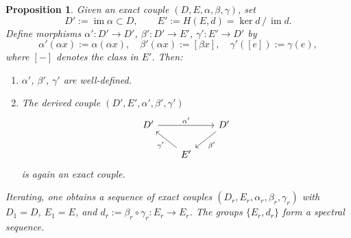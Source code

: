 \documentclass[12pt,a4paper]{article}
\newtheorem{proposition}[theorem]{Proposition}
\theoremstyle{definition}
\begin{document}
\begin{proposition}\label{prop:derived-couple}
Given an exact couple $(D,E,\alpha,\beta,\gamma)$, set
\[
  D' := \operatorname{im}\alpha \subset D,\qquad
  E' := H(E,d) = \ker d\,/\,\operatorname{im} d.
\]
Define morphisms $\alpha':D'\to D'$, $\beta':D'\to E'$, $\gamma':E'\to D'$ by
\[
  \alpha'(\alpha x) := \alpha(\alpha x),\quad
  \beta'(\alpha x) := [\beta x],\quad
  \gamma'([e]) := \gamma(e),
\]
where $[{-}]$ denotes the class in $E'$.  Then:
\begin{enumerate}
  \item $\alpha'$, $\beta'$, $\gamma'$ are well-defined.
  \item The derived couple $(D',E',\alpha',\beta',\gamma')$
    \[
    \begin{tikzcd}[column sep=2em, row sep=1.6em]
      D' \ar[rr,"\alpha'"] && D' \ar[dl,"\beta'"]\\
      & E' \ar[ul,"\gamma'"] &
    \end{tikzcd}
    \]
    is again an exact couple.
\end{enumerate}
Iterating, one obtains a sequence of exact couples $(D_r,E_r,\alpha_r,\beta_r,\gamma_r)$
with $D_1=D$, $E_1=E$, and $d_r:=\beta_r\circ\gamma_r:E_r\to E_r$.  The groups
$\{E_r, d_r\}$ form a spectral sequence.
\end{proposition}
\end{document}
